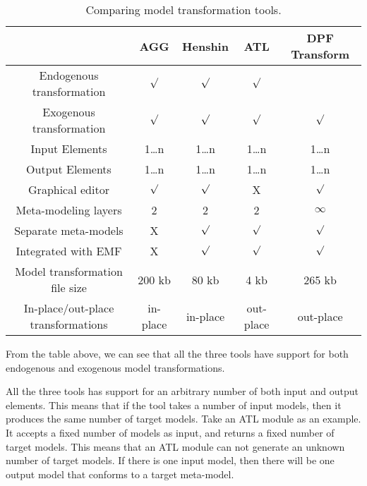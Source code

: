 \begin{table}[ht]
\renewcommand*\arraystretch{1.2}
\centering
\begin{tabular}{| c | c | c | c | c |}
\hline
& AGG & Henshin   & ATL   & DPF Transform \\
\hline
Endogenous transformation & $\surd$ & $\surd$ & $\surd$ & \\

Exogenous transformation & $\surd$ & $\surd$ & $\surd$ & $\surd$\\

Input Elements & 1\ldots n & 1\ldots n & 1\ldots n & 1\ldots n\\

Output Elements & 1\ldots n & 1\ldots n & 1\ldots n & 1\ldots n\\

Graphical editor & $\surd$ & $\surd$ & X & $\surd$ \\

Meta-modeling layers & 2 & 2 & 2 & $\infty$ \\

Separate meta-models & X &  $\surd$ &  $\surd$ &  $\surd$ \\

Integrated with EMF & X & $\surd$ & $\surd$ & $\surd$ \\ 

Model transformation file size & 200 kb & 80 kb & 4 kb & 265 kb\\

In-place/out-place transformations & in-place &
in-place & out-place  & out-place \\

\hline
\end{tabular}
\caption{Comparing model transformation tools.}
\end{table} 



From the table above, we can see that all the three tools have support
for both endogenous and exogenous model transformations. 

All the three tools has support for an arbitrary number of both input and
output elements. This means that if the tool takes a number of input models, then it
produces the same number of target models. Take an ATL module as an example. It
accepts a fixed number of models as input, and returns a fixed number of target
models. This means that an ATL module can not generate an unknown number of
target models. If there is one input model, then there will be one output model
that conforms to a target meta-model.

